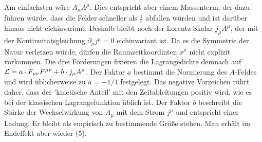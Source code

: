 Am einfachsten wäre $A_{\mu} A^{\mu}$. Dies entspricht aber einem Massenterm, der dazu führen würde, dass die Felder schneller als $\frac{1}{r}$ abfallen würden und ist darüber hinaus nicht eichinvariant. Deshalb bleibt noch der Lorentz-Skalar $j_{\mu} A^{\mu}$, der mit der Kontinuitätsgleichung $\partial_{\mu} j^{\mu} = 0$ eichinvariant ist. Da es die Symmetrie der Natur verletzen würde, dürfen die Raumzeitkoordinten $x^{\mu}$ nicht explizit vorkommen. 
Die drei Forderungen fixieren die Lagrangedichte demnach auf $\mathcal{L} = a \cdot F_{\mu \nu} F^{\mu \nu} + b \cdot j_{\mu} A^{\mu}$. Der Faktor $a$ bestimmt die Normierung des $A$-Feldes und wird üblicherweise zu $a = - 1/4$ festgelegt. Das negative Vorzeichen rührt daher, dass der 'kinetische Anteil' mit den Zeitableitungen positiv wird, wie es bei der klassischen Lagrangefunktion üblich ist.
Der Faktor $b$ beschreibt die Stärke der Wechselwirkung von $A_{\mu}$ mit dem Strom $j^{\mu}$ und entspricht einer Ladung. Er bleibt als empirisch zu bestimmende Größe stehen. Man erhält im Endeffekt aber wieder (5).
